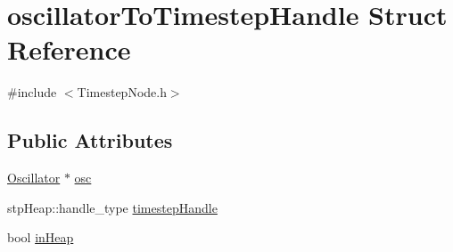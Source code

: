 \hypertarget{structoscillator_to_timestep_handle}{\section{oscillator\+To\+Timestep\+Handle Struct Reference}
\label{structoscillator_to_timestep_handle}
}


{\ttfamily \#include $<$Timestep\+Node.\+h$>$}

\subsection*{Public Attributes}
\begin{DoxyCompactItemize}
\item 
\hyperlink{class_oscillator}{Oscillator} $\ast$ \hyperlink{structoscillator_to_timestep_handle_ad8b716b7b0519689a5267f9c5875e055}{osc}
\item 
stp\+Heap\+::handle\+\_\+type \hyperlink{structoscillator_to_timestep_handle_aa4d736d3a931e47677113c16052c2713}{timestep\+Handle}
\item 
bool \hyperlink{structoscillator_to_timestep_handle_a93851e264ab8e6f9c9b8a725bd33984b}{in\+Heap}
\end{DoxyCompactItemize}


